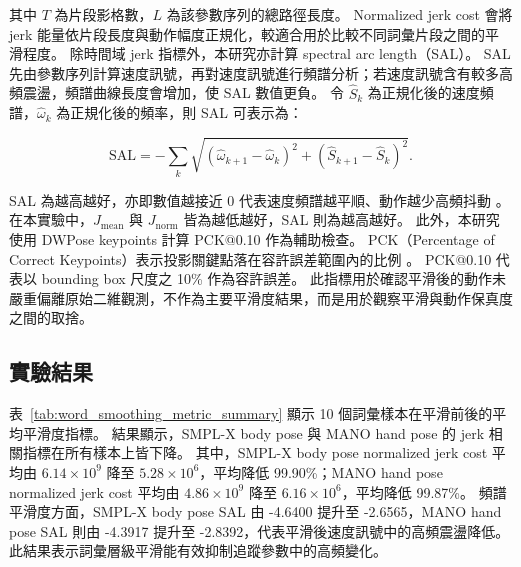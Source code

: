 \documentclass[class=NCU_thesis, crop=false]{standalone}
\begin{document}
其中 $T$ 為片段影格數，$L$ 為該參數序列的總路徑長度。
Normalized jerk cost 會將 jerk 能量依片段長度與動作幅度正規化，較適合用於比較不同詞彙片段之間的平滑程度。
除時間域 jerk 指標外，本研究亦計算 spectral arc length（SAL）。
SAL 先由參數序列計算速度訊號，再對速度訊號進行頻譜分析；若速度訊號含有較多高頻震盪，頻譜曲線長度會增加，使 SAL 數值更負。
令 $\hat{S}_{k}$ 為正規化後的速度頻譜，$\hat{\omega}_{k}$ 為正規化後的頻率，則 SAL 可表示為：

\begin{equation}
    \mathrm{SAL}
    =
    -
    \sum_{k}
    \sqrt{
    \left(
    \hat{\omega}_{k+1}
    -
    \hat{\omega}_{k}
    \right)^{2}
    +
    \left(
    \hat{S}_{k+1}
    -
    \hat{S}_{k}
    \right)^{2}
    }.
    \label{eq:word_smoothing_sal}
\end{equation}

SAL 為越高越好，亦即數值越接近 0 代表速度頻譜越平順、動作越少高頻抖動 \cite{balasubramanian2012smoothness,balasubramanian2015smoothness}。
在本實驗中，$J_{\mathrm{mean}}$ 與 $J_{\mathrm{norm}}$ 皆為越低越好，SAL 則為越高越好。
此外，本研究使用 DWPose keypoints 計算 PCK@0.10 作為輔助檢查。
PCK（Percentage of Correct Keypoints）表示投影關鍵點落在容許誤差範圍內的比例 \cite{toshev2014deeppose}。
PCK@0.10 代表以 bounding box 尺度之 10\% 作為容許誤差。
此指標用於確認平滑後的動作未嚴重偏離原始二維觀測，不作為主要平滑度結果，而是用於觀察平滑與動作保真度之間的取捨。

\subsection{實驗結果}

表~\ref{tab:word_smoothing_metric_summary} 顯示 10 個詞彙樣本在平滑前後的平均平滑度指標。
結果顯示，SMPL-X body pose 與 MANO hand pose 的 jerk 相關指標在所有樣本上皆下降。
其中，SMPL-X body pose normalized jerk cost 平均由 $6.14\times10^{9}$ 降至 $5.28\times10^{6}$，平均降低 99.90\%；MANO hand pose normalized jerk cost 平均由 $4.86\times10^{9}$ 降至 $6.16\times10^{6}$，平均降低 99.87\%。
頻譜平滑度方面，SMPL-X body pose SAL 由 -4.6400 提升至 -2.6565，MANO hand pose SAL 則由 -4.3917 提升至 -2.8392，代表平滑後速度訊號中的高頻震盪降低。
此結果表示詞彙層級平滑能有效抑制追蹤參數中的高頻變化。
\end{document}
